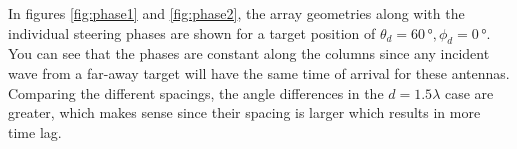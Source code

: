 In figures \ref{fig:phase1} and \ref{fig:phase2}, the array geometries along with the individual steering phases are shown for a target position of $\theta_{d}=60\,\si{\degree}, \phi_{d}=0\,\si{\degree}$. You can see that the phases are constant along the columns since any incident wave from a far-away target will have the same time of arrival for these antennas. Comparing the different spacings, the angle differences in the $d=1.5\lambda$ case are greater, which makes sense since their spacing is larger which results in more time lag.
